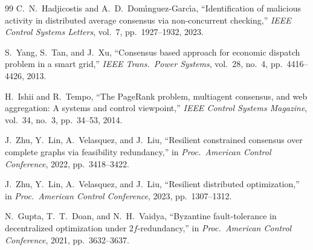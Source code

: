 \documentclass[journal]{IEEEtran}
\begin{document}
\begin{thebibliography}{99}
C.~N.~Hadjicostis and A.~D.~Dom\'{\i}nguez-Garc\'{\i}a,
``Identification of malicious activity in distributed average consensus
via non-concurrent checking,''
\emph{IEEE Control Systems Letters}, vol.~7, pp.~1927--1932, 2023.

S.~Yang, S.~Tan, and J.~Xu,
``Consensus based approach for economic dispatch problem in a smart grid,''
\emph{IEEE Trans.\ Power Systems}, vol.~28, no.~4, pp.~4416--4426, 2013.

H.~Ishii and R.~Tempo,
``The PageRank problem, multiagent consensus, and web aggregation:
A systems and control viewpoint,''
\emph{IEEE Control Systems Magazine}, vol.~34, no.~3, pp.~34--53, 2014.

J.~Zhu, Y.~Lin, A.~Velasquez, and J.~Liu,
``Resilient constrained consensus over complete graphs via feasibility
redundancy,''
in \emph{Proc.\ American Control Conference}, 2022, pp.~3418--3422.

J.~Zhu, Y.~Lin, A.~Velasquez, and J.~Liu,
``Resilient distributed optimization,''
in \emph{Proc.\ American Control Conference}, 2023, pp.~1307--1312.

N.~Gupta, T.~T.~Doan, and N.~H.~Vaidya,
``Byzantine fault-tolerance in decentralized optimization under
$2f$-redundancy,''
in \emph{Proc.\ American Control Conference}, 2021, pp.~3632--3637.

\end{thebibliography}
\end{document}
